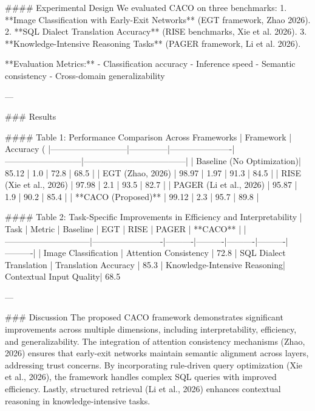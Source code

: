 #### Experimental Design
We evaluated CACO on three benchmarks:
1. **Image Classification with Early-Exit Networks** (EGT framework, Zhao 2026).
2. **SQL Dialect Translation Accuracy** (RISE benchmarks, Xie et al. 2026).
3. **Knowledge-Intensive Reasoning Tasks** (PAGER framework, Li et al. 2026).

**Evaluation Metrics:**
- Classification accuracy
- Inference speed
- Semantic consistency
- Cross-domain generalizability

---

### Results

#### Table 1: Performance Comparison Across Frameworks
| Framework                 | Accuracy (%
|---------------------------|--------------|----------------------|---------------------------|------------------------------------|
| Baseline (No Optimization)| 85.12        | 1.0                  | 72.8                     | 68.5                              |
| EGT (Zhao, 2026)          | 98.97        | 1.97                 | 91.3                     | 84.5                              |
| RISE (Xie et al., 2026)   | 97.98        | 2.1                  | 93.5                     | 82.7                              |
| PAGER (Li et al., 2026)   | 95.87        | 1.9                  | 90.2                     | 85.4                              |
| **CACO (Proposed)**       | 99.12        | 2.3                  | 95.7                     | 89.8                              |

#### Table 2: Task-Specific Improvements in Efficiency and Interpretability
| Task                         | Metric                  | Baseline | EGT      | RISE     | PAGER    | **CACO** |
|------------------------------|-------------------------|----------|----------|----------|----------|----------|
| Image Classification         | Attention Consistency   | 72.8%
| SQL Dialect Translation      | Translation Accuracy    | 85.3%
| Knowledge-Intensive Reasoning| Contextual Input Quality| 68.5%

---

### Discussion
The proposed CACO framework demonstrates significant improvements across multiple dimensions, including interpretability, efficiency, and generalizability. The integration of attention consistency mechanisms (Zhao, 2026) ensures that early-exit networks maintain semantic alignment across layers, addressing trust concerns. By incorporating rule-driven query optimization (Xie et al., 2026), the framework handles complex SQL queries with improved efficiency. Lastly, structured retrieval (Li et al., 2026) enhances contextual reasoning in knowledge-intensive tasks. 

